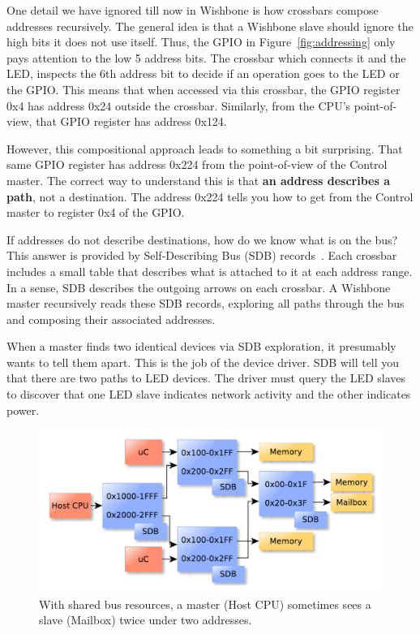 \documentclass[a4paper]{jacow}
\begin{document}
One detail we have ignored till now in Wishbone is how crossbars compose
addresses recursively.
The general idea is that a Wishbone slave should ignore the high bits it
does not use itself.
Thus, the GPIO in Figure~\ref{fig:addressing} only pays attention to the low 
5 address bits.
The crossbar which connects it and the LED,
inspects the 6th address bit to decide if an operation goes to the LED or
the GPIO.
This means that when accessed via this crossbar, 
the GPIO register 0x4 has address 0x24 outside the crossbar.
Similarly, from the CPU's point-of-view, that GPIO register has address 0x124.

However, this compositional approach leads to something a bit surprising.
That same GPIO register has address 0x224 from the point-of-view of 
the Control master.
The correct way to understand this is that \textbf{an address describes a path}, 
not a destination.
The address 0x224 tells you how to get from the Control master to register
0x4 of the GPIO.

If addresses do not describe destinations, how do we know what is on the bus?
This answer is provided by Self-Describing Bus (SDB) records~\cite{sdb}.
Each crossbar includes a small table that describes what is attached to it
at each address range.
In a sense, SDB describes the outgoing arrows on each crossbar.
A Wishbone master recursively reads these SDB records, 
exploring all paths through the bus and composing their associated addresses.

When a master finds two identical devices via SDB exploration,
it presumably wants to tell them apart.
This is the job of the device driver.
SDB will tell you that there are two paths to LED devices.
The driver must query the LED slaves to discover that one LED slave
indicates network activity and the other indicates power.

\begin{figure}[t]
  \centering
  \includegraphics*[width=\columnwidth]{diamond-bus}
  \caption{With shared bus resources, a master (Host CPU)
  sometimes sees a slave (Mailbox) twice under two addresses.}
  \label{fig:diamond-bus}
\end{figure}
\end{document}
